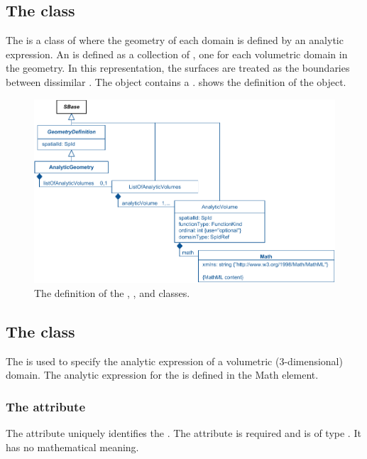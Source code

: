 \subsection{The  class}
\label{AnalyticGeometry-class}
\label{ListOfAnalyticVolumes-class}
The \AnalyticGeometry is a class of \GeometryDefinition where the geometry of each domain is defined by an analytic expression. An \AnalyticGeometry is defined as a collection of \AnalyticVolumes, one \AnalyticVolume for each volumetric domain in the geometry. In this representation, the surfaces are treated as the boundaries between dissimilar \AnalyticVolumes. The \AnalyticGeometry object contains a \ListOfAnalyticVolumes.  shows the definition of the \AnalyticGeometry object.

\begin{figure}[ht]
  \includegraphics{figs/AnalyticGeometry-uml}
  \caption{The definition of the \AnalyticGeometry, \ListOfAnalyticVolumes, and \AnalyticVolume classes.}
  \label{AnalyticGeometry-uml}
  \label{ListOfAnalyticVolumes-uml}
  \label{AnalyticVolume-uml}
\end{figure}


\subsection{The  class}
\label{AnalyticVolume-class}
The \AnalyticVolume is used to specify the analytic expression of a volumetric (3-dimensional) domain. The analytic expression for the \AnalyticVolume is defined in the Math element.

\subsubsection{The  attribute}
The  attribute uniquely identifies the \AnalyticVolume. The attribute is required and is of type .  It has no mathematical meaning.

